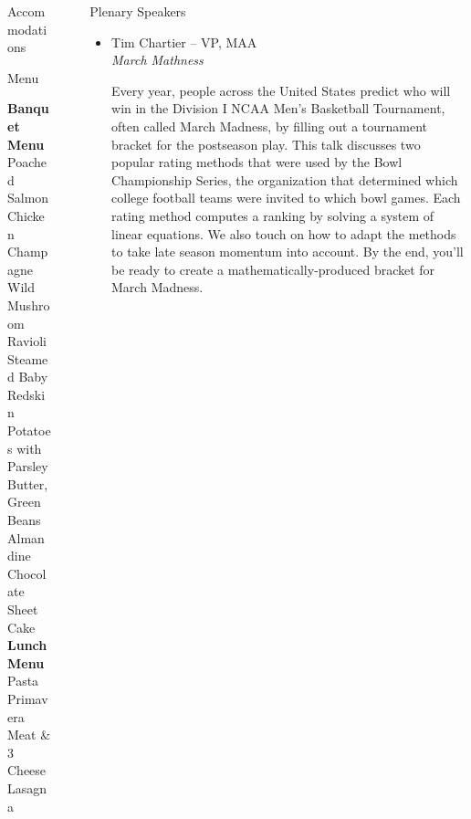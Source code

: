 \documentclass[final,hyperref={pdfpagelabels=false},12pt]{beamer}
\let\olditem\item
\renewcommand{\item}{\olditem\justifying}
\begin{document}
\begin{frame}[t]
\begin{columns}[t]
\begin{column}{.465\textwidth}
\begin{block}{Accommodations}
\begin{itemize}
\end{itemize}
\end{block}


\begin{block}{Menu}

{\bf Banquet Menu} \\
 Poached Salmon\\ 
 Chicken Champagne\\
 Wild Mushroom Ravioli\\ 
 Steamed Baby Redskin Potatoes with Parsley Butter,
 Green Beans Almandine\\ 
 Chocolate Sheet Cake  \\

{\bf Lunch Menu}\\
 Pasta Primavera\\
 Meat \& $3$ Cheese Lasagna
\end{block}

\end{column} %



\begin{column}{.03\textwidth}\end{column} %
 
\begin{column}{.465\textwidth} %


\begin{block}{Plenary Speakers}

\begin{itemize}
\item Tim Chartier – VP, MAA\\

{\emph{March Mathness}}

Every year, people across the United States predict who will win in the Division I NCAA Men's Basketball Tournament, often called March Madness, by filling out a tournament bracket for the postseason play. This talk discusses two popular rating methods that were used by the Bowl Championship Series, the organization that determined which college football teams were invited to which bowl games. Each rating method computes a ranking by solving a system of linear equations. We also touch on how to adapt the methods to take late season momentum into account. By the end, you'll be ready to create a mathematically-produced bracket for March Madness.



\end{itemize}
\end{block}
\end{column}
\end{columns}
\end{frame}
\end{document}
